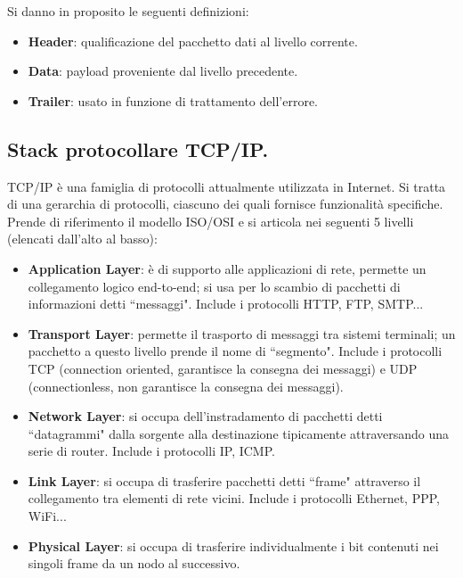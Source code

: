 \documentclass[11pt, italian, openany]{book}
\begin{document}
\begin{sloppypar}
Si danno in proposito le seguenti definizioni:
\begin{itemize}[topsep=0pt]
	\itemsep-0.3em
	\item \textbf{Header}: qualificazione del pacchetto dati al livello corrente.
	\item \textbf{Data}: payload proveniente dal livello precedente.
	\item \textbf{Trailer}: usato in funzione di trattamento dell'errore.
\end{itemize}

\subsection*{Stack protocollare TCP/IP.}
TCP/IP \`e una famiglia di protocolli attualmente utilizzata in Internet. Si tratta di una gerarchia di protocolli, ciascuno dei quali fornisce
funzionalità specifiche. Prende di riferimento il modello ISO/OSI e si articola nei seguenti 5 livelli (elencati dall'alto al basso):
\begin{itemize}[topsep=0pt]
	\itemsep-0.3em
	\item \textbf{Application Layer}: \`e di supporto alle applicazioni di rete, permette un collegamento logico end-to-end; si usa per lo scambio di
	pacchetti di informazioni detti ``messaggi". Include i protocolli HTTP, FTP, SMTP...
	\item \textbf{Transport Layer}: permette il trasporto di messaggi tra sistemi terminali; un pacchetto a questo livello prende il nome di ``segmento".
	Include i protocolli TCP (connection oriented, garantisce la consegna dei messaggi) e UDP (connectionless, non garantisce la consegna dei messaggi).
	\item \textbf{Network Layer}: si occupa dell'instradamento di pacchetti detti ``datagrammi" dalla sorgente alla destinazione tipicamente attraversando
	una serie di router. Include i protocolli IP, ICMP.
	\item \textbf{Link Layer}: si occupa di trasferire pacchetti detti ``frame" attraverso il collegamento tra elementi di rete vicini. Include i protocolli
	Ethernet, PPP, WiFi...
	\item \textbf{Physical Layer}: si occupa di trasferire individualmente i bit contenuti nei singoli frame da un nodo al successivo.
\end{itemize}


\end{sloppypar}
\end{document}
